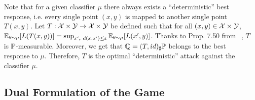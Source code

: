 \begin{rmq}
Note that for a given classifier $\mu$ there always exists a ``deterministic'' best response, i.e. every single point $(x,y)$ is mapped to another single point $T(x,y)$. Let $T:\mathcal{X}\times\mathcal{Y}\to\mathcal{X}\times\mathcal{Y}$ be defined such that for all $(x,y)\in\mathcal{X}\times\mathcal{Y}$, $\EE_{\theta\sim\mu}\left[\loss(T(x,y))\right] = \sup_{x',~d(x,x')\leq\varepsilon}\EE_{\theta\sim\mu}\left[ L(x',y)\right]$. Thanks to Prop. 7.50 from ~\citep{bertsekas2004stochastic}, $T$ is $\mathbb{P}$-measurable. Moreover, we get that $\mathbb{Q} = (T,id)_\sharp \mathbb{P}$ belongs to the best response to $\mu$. Therefore, $T$ is the optimal ``deterministic'' attack against the classifier $\mu$.
\end{rmq}




\subsection{Dual Formulation of the Game}

